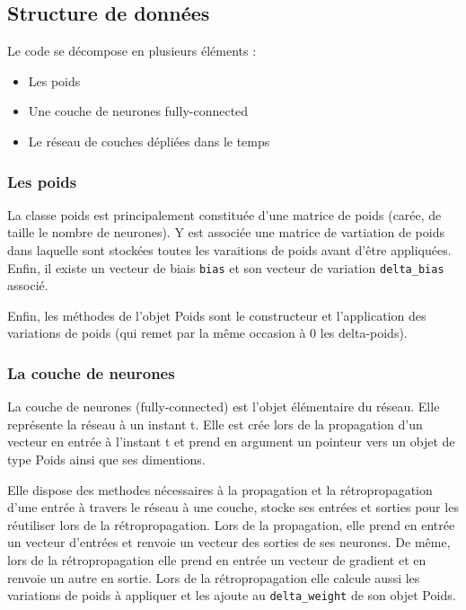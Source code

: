 \bigskip

\subsection{Structure de données}

Le code se décompose en plusieurs éléments :
\begin{itemize}
  \item Les poids
  \item Une couche de neurones fully-connected
  \item Le réseau de couches dépliées dans le temps
\end{itemize}

\subsubsection{Les poids}

La classe poids est principalement constituée d'une matrice de poids (carée, de
taille le nombre de neurones). Y est associée une matrice de vartiation de poids
dans laquelle sont stockées toutes les varaitions de poids avant d'être
appliquées. Enfin, il existe un vecteur de biais \verb+bias+ et son vecteur
de variation \verb+delta_bias+ associé.

Enfin, les méthodes de l'objet Poids sont le constructeur et
l'application des variations de poids (qui remet par la même occasion à 0
les delta-poids).

\subsubsection{La couche de neurones}

La couche de neurones (fully-connected) est l'objet élémentaire du réseau. Elle
représente la réseau à un instant t. Elle est crée lors de la propagation d'un
vecteur en entrée à l'instant t et prend en argument un pointeur vers un objet
de type Poids ainsi que ses dimentions.

\medskip

Elle dispose des methodes nécessaires à la propagation et la rétropropagation
d'une entrée à travers le réseau à une couche, stocke ses entrées et sorties
pour les réutiliser lors de la rétropropagation. Lors de la propagation, elle
prend en entrée un vecteur d'entrées et renvoie un vecteur des sorties de
ses neurones. De même, lors de la rétropropagation elle prend en entrée un
vecteur de gradient et en renvoie un autre en sortie. Lors de la
rétropropagation elle calcule aussi les variations de poids à appliquer et les
ajoute au \verb+delta_weight+ de son objet Poids.


